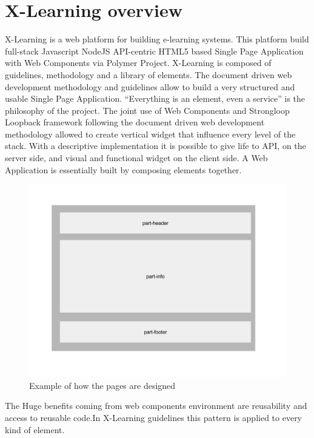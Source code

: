 \section{X-Learning overview}
\label{sec:x_learning_overview}

X-Learning is a web platform for building e-learning systems. This platform build full-stack Javascript NodeJS API-centric HTML5 based Single Page Application with Web Components via Polymer Project. X-Learning is composed of guidelines, methodology and a library of elements. The document driven web development methodology and guidelines allow to build a very structured and usable Single Page Application. 
“Everything is an element, even a service” is the philosophy of the project. The joint use of Web Components and Strongloop Loopback framework following the document driven web development methodology allowed to create vertical widget that influence every level of the stack. With a descriptive implementation it is possible to give life to API, on the server side, and visual and functional widget on the client side. A Web Application is essentially built by composing elements together.

\begin{figure}[htb]
 \centering
 \includegraphics[width=1.0\linewidth]{images/chapter4/design-page.jpg}\hfill
 \caption[Design page]{Example of how the pages are designed}
 \label{fig:design_page}
\end{figure}

The Huge benefits coming from web components environment are reusability and access to reusable code.In X-Learning guidelines this pattern is applied to every kind of element.